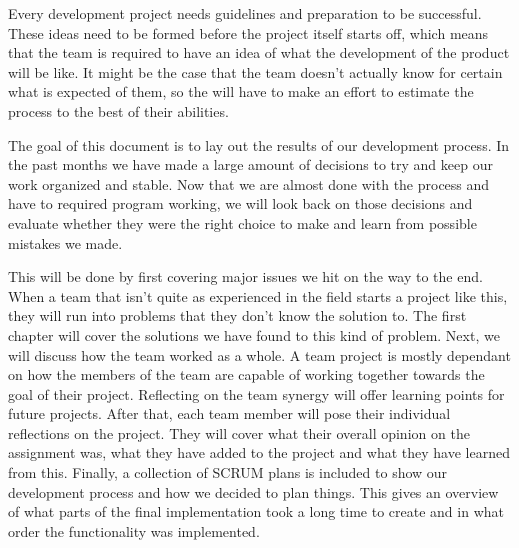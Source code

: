 Every development project needs guidelines and preparation to be successful. These ideas need to be formed before the project itself starts off, which means that the team is required to have an idea of what the development of the product will be like. It might be the case that the team doesn't actually know for certain what is expected of them, so the will have to make an effort to estimate the process to the best of their abilities.

The goal of this document is to lay out the results of our development process. In the past months we have made a large amount of decisions to try and keep our work organized and stable. Now that we are almost done with the process and have to required program working, we will look back on those decisions and evaluate whether they were the right choice to make and learn from possible mistakes we made.

This will be done by first covering major issues we hit on the way to the end. When a team that isn't quite as experienced in the field starts a project like this, they will run into problems that they don't know the solution to. The first chapter will cover the solutions we have found to this kind of problem. Next, we will discuss how the team worked as a whole. A team project is mostly dependant on how the members of the team are capable of working together towards the goal of their project. Reflecting on the team synergy will offer learning points for future projects.
After that, each team member will pose their individual reflections on the project. They will cover what their overall opinion on the assignment was, what they have added to the project and what they have learned from this.
Finally, a collection of SCRUM plans is included to show our development process and how we decided to plan things. This gives an overview of what parts of the final implementation took a long time to create and in what order the functionality was implemented.
